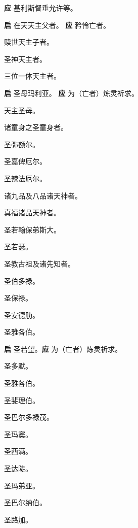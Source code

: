 \documentclass[UTF8,17pt]{ctexart}
\begin{document}
\textbf{应} \quad 基利斯督垂允许等。

\textbf{启} \quad 在天天主⽗者。 \hfill \textbf{应} \quad 矜怜亡者。

 赎世天主⼦者。

 圣神天主者。

 三位⼀体天主者。

\textbf{启} \quad 圣母玛利亚。 \hfill \textbf{应} \quad 为（亡者）炼灵祈求。

 天主圣母。

 诸童⾝之圣童⾝者。

 圣弥额尔。

 圣嘉俾厄尔。

 圣辣法厄尔。

 诸九品及⼋品诸天神者。

 真福诸品天神者。

 圣若翰保弟斯⼤。

 圣若瑟。

 圣教古祖及诸先知者。

 圣伯多禄。

 圣保禄。

 圣安德肋。

 圣雅各伯。

\textbf{启} \quad 圣若望。\hfill \textbf{应} \quad 为（亡者）炼灵祈求。

 圣多默。

 圣雅各伯。

 圣斐理伯。

 圣巴尔多禄茂。

 圣玛窦。

 圣西满。

 圣达陡。

 圣玛弟亚。

 圣巴尔纳伯。

 圣路加。
\end{document}
